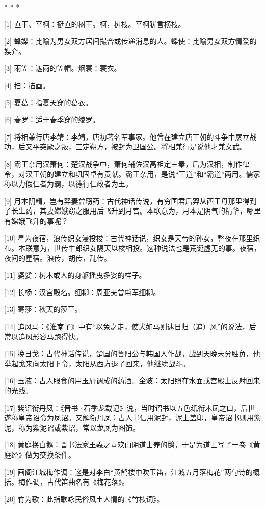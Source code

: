 \documentclass[12pt,UTF8]{ctexbook}
\begin{document}
* * *



[1] 直干、平柯：挺直的树干。柯，树枝。平柯犹言横枝。

[2] 蜂媒：比喻为男女双方居间撮合或传递消息的人。蝶使：比喻男女双方情爱的媒介。

[3] 雨笠：遮雨的笠帽。烟蓑：蓑衣。

[4] 扫：描画。

[5] 夏葛：指夏天穿的葛衣。

[6] 春罗：适于春季穿的绫罗。

[7] 将相兼行唐李靖：李靖，唐初著名军事家。他曾在建立唐王朝的斗争中屡立战功，后又平突厥之叛，三定朔方，被封为卫国公。将相兼行是说他才兼文武。

[8] 霸王杂用汉萧何：楚汉战争中，萧何辅佐汉高祖定三秦，后为汉相，制作律令，对汉王朝的建立和巩固卓有贡献。霸王杂用，是说“王道”和“霸道”两用。儒家称以力假仁者为霸，以德行仁政者为王。

[9] 月本阴精，岂有羿妻曾窃药：古代神话传说，有穷国君后羿从西王母那里得到了长生药，其妻嫦娥窃之服用后飞升到月宫。本联意为，月本是阴气的精华，哪里有嫦娥飞升的事呢？

[10] 星为夜宿，浪传织女漫投梭：古代神话说，织女是天帝的孙女，整夜在那里织布。本联意为，世传牛郎织女隔天以梭相投。这种说法也是荒诞虚无的事。夜宿，夜间的星宿。浪传，胡传，乱传。

[11] 婆娑：树木或人的身躯摇曳多姿的样子。

[12] 长杨：汉宫殿名。细柳：周亚夫曾屯军细柳。

[13] 寒莎：秋天的莎草。

[14] 追风马：《淮南子》中有“以兔之走，使犬如马则逮日归（追）风”的说法，后常以追风形容马跑得快。

[15] 挽日戈：古代神话传说，楚国的鲁阳公与韩国人作战，战到天晚未分胜负，他举起戈来向太阳下令，太阳从西方退了回来，他继续战斗。

[16] 玉液：古人服食的用玉屑调成的药酒。金波：太阳照在水面或宫殿上反射回来的光线。

[17] 紫诏衔丹凤：《晋书·石季龙载记》说，当时诏书以五色纸衔木凤之口，后世遂称皇帝诏令为凤诏。又解衔丹凤：古人书信用泥封，泥上盖印，皇帝诏书则用紫泥，称为紫泥诏或紫诏，常以龙凤为图饰。

[18] 黄庭换白鹅：晋书法家王羲之喜欢山阴道士养的鹅，于是为道士写了一卷《黄庭经》做为交换条件。

[19] 画阁江城梅作调：这是对李白“黄鹤楼中吹玉笛，江城五月落梅花”两句诗的概括。梅作调，古代笛曲名有《梅花落》。

[20] 竹为歌：此指歌咏民俗风土人情的《竹枝词》。
\end{document}
